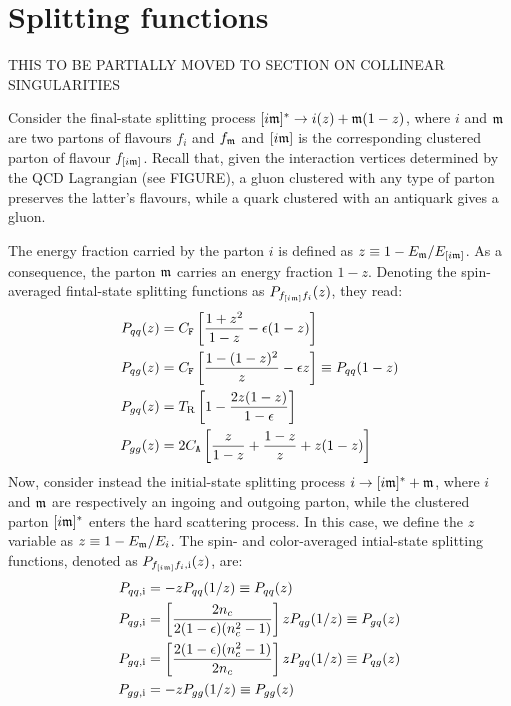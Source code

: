 \section{Splitting functions}

THIS TO BE PARTIALLY MOVED TO SECTION ON COLLINEAR SINGULARITIES

Consider the final-state splitting process $ [i\mathfrak{m}]^* \rightarrow i(z) + \mathfrak{m}(1-z) $, where $ i $ and $ \mathfrak{m} $ are two partons of flavours $ f_i $ and $ f_{\mathfrak{m}} $ and $ [i\mathfrak{m}] $ is the corresponding clustered parton of flavour $ f_{[i\mathfrak{m}]} $. Recall that, given the interaction vertices determined by the QCD Lagrangian  (see FIGURE), a gluon clustered with any type of parton preserves the latter's flavours, while a quark clustered with an antiquark gives a gluon.

The energy fraction carried by the parton $ i $ is defined as $ z \equiv 1 - E_{\mathfrak{m}} / E_{[i\mathfrak{m}]} $. As a consequence, the parton $ \mathfrak{m} $ carries an energy fraction $ 1 - z $. Denoting the spin-averaged fintal-state splitting functions as $ P_{f_{[i\mathfrak{m}]}f_i}(z) $, they read:
\begin{align}
  P_{qq}(z) & = C_\mathtt{F} \left[ \frac{1 + z^2}{1 - z} - \epsilon (1 - z) \right] \\
  P_{qg}(z) & = C_\mathtt{F} \left[ \frac{1 - (1 - z)^2}{z} - \epsilon z \right] \equiv P_{qq}(1 - z) \\
  P_{gq}(z) & = T_\text{R} \left[ 1 - \frac{2z (1 - z)}{1 - \epsilon} \right] \\
  P_{gg}(z) & = 2 C_\mathtt{A} \left[ \frac{z}{1 - z} + \frac{1 - z}{z} + z (1 - z) \right]
\end{align}
Now, consider instead the initial-state splitting process $ i \rightarrow [i\mathfrak{m}]^* + \mathfrak{m} $, where $ i $ and $ \mathfrak{m} $ are respectively an ingoing and outgoing parton, while the clustered parton $ [i\mathfrak{m}]^* $ enters the hard scattering process. In this case, we define the $ z $ variable as $ z \equiv 1 - E_{\mathfrak{m}} / E_i $. The spin- and color-averaged intial-state splitting functions, denoted as $ P_{f_{[i\mathfrak{m}]}f_i, \text{i}}(z) $, are:
\begin{align}
  P_{qq,\text{i}} & = - z P_{qq}(1/z) \equiv P_{qq}(z) \\
  P_{qg,\text{i}} & = \left[ \frac{2n_c}{2 (1 - \epsilon) (n_c^2 - 1)} \right] z P_{qg}(1/z) \equiv P_{gq}(z) \\
  P_{gq,\text{i}} & = \left[ \frac{2 (1 - \epsilon) (n_c^2 - 1)}{2n_c} \right] z P_{gq}(1/z) \equiv P_{qg}(z) \\
  P_{gg,\text{i}} & = - z P_{gg}(1/z) \equiv P_{gg}(z)
\end{align}
